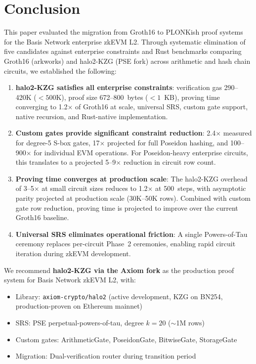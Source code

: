 
\section{Conclusion}
\label{sec:conclusion}

This paper evaluated the migration from Groth16 to PLONKish proof
systems for the Basis Network enterprise zkEVM L2. Through
systematic elimination of five candidates against enterprise
constraints and Rust benchmarks comparing Groth16 (arkworks)
and halo2-KZG (PSE fork) across arithmetic and hash chain
circuits, we established the following:

\begin{enumerate}
  \item \textbf{halo2-KZG satisfies all enterprise constraints}:
    verification gas 290--420K ($< 500$K), proof size 672--800~bytes
    ($< 1$~KB), proving time converging to 1.2$\times$ of Groth16
    at scale, universal SRS, custom gate support, native recursion,
    and Rust-native implementation.

  \item \textbf{Custom gates provide significant constraint
    reduction}: 2.4$\times$ measured for degree-5 S-box gates,
    17$\times$ projected for full Poseidon hashing, and
    100--900$\times$ for individual EVM operations. For
    Poseidon-heavy enterprise circuits, this translates to a
    projected 5--9$\times$ reduction in circuit row count.

  \item \textbf{Proving time converges at production scale}: The
    halo2-KZG overhead of 3--5$\times$ at small circuit sizes
    reduces to 1.2$\times$ at 500~steps, with asymptotic parity
    projected at production scale (30K--50K rows). Combined with
    custom gate row reduction, proving time is projected to
    improve over the current Groth16 baseline.

  \item \textbf{Universal SRS eliminates operational friction}: A
    single Powers-of-Tau ceremony replaces per-circuit Phase~2
    ceremonies, enabling rapid circuit iteration during zkEVM
    development.
\end{enumerate}

We recommend \textbf{halo2-KZG via the Axiom fork} as the
production proof system for Basis Network zkEVM L2, with:

\begin{itemize}
  \item Library: \texttt{axiom-crypto/halo2} (active development,
    KZG on BN254, production-proven on Ethereum mainnet)
  \item SRS: PSE perpetual-powers-of-tau, degree $k = 20$
    ($\sim$1M rows)
  \item Custom gates: ArithmeticGate, PoseidonGate, BitwiseGate,
    StorageGate
  \item Migration: Dual-verification router during transition
    period
\end{itemize}

